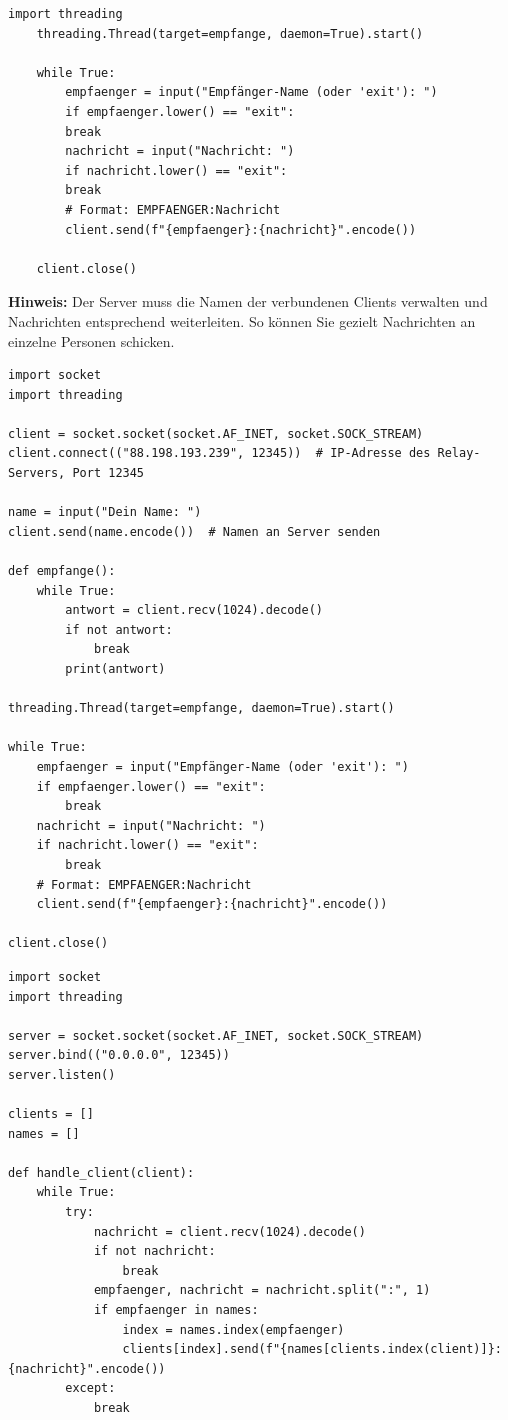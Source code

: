 \begin{myexercise}
\begin{lstlisting}[caption={client.py}]
    import threading
    threading.Thread(target=empfange, daemon=True).start()

    while True:
        empfaenger = input("Empfänger-Name (oder 'exit'): ")
        if empfaenger.lower() == "exit":
        break
        nachricht = input("Nachricht: ")
        if nachricht.lower() == "exit":
        break
        # Format: EMPFAENGER:Nachricht
        client.send(f"{empfaenger}:{nachricht}".encode())

    client.close()
\end{lstlisting}
    \textbf{Hinweis:} Der Server muss die Namen der verbundenen Clients verwalten und Nachrichten entsprechend weiterleiten. So können Sie gezielt Nachrichten an einzelne Personen schicken.
    \begin{myanswer}
        \begin{lstlisting}[caption=\texttt{client.py}]
import socket
import threading

client = socket.socket(socket.AF_INET, socket.SOCK_STREAM)
client.connect(("88.198.193.239", 12345))  # IP-Adresse des Relay-Servers, Port 12345

name = input("Dein Name: ")
client.send(name.encode())  # Namen an Server senden

def empfange():
    while True:
        antwort = client.recv(1024).decode()
        if not antwort:
            break
        print(antwort)

threading.Thread(target=empfange, daemon=True).start()

while True:
    empfaenger = input("Empfänger-Name (oder 'exit'): ")
    if empfaenger.lower() == "exit":
        break
    nachricht = input("Nachricht: ")
    if nachricht.lower() == "exit":
        break
    # Format: EMPFAENGER:Nachricht
    client.send(f"{empfaenger}:{nachricht}".encode())

client.close()
        \end{lstlisting}
    \end{myanswer}
    \begin{myanswer}
        \begin{lstlisting}[caption=\texttt{server.py}]
import socket
import threading

server = socket.socket(socket.AF_INET, socket.SOCK_STREAM)
server.bind(("0.0.0.0", 12345))
server.listen()

clients = []
names = []

def handle_client(client):
    while True:
        try:
            nachricht = client.recv(1024).decode()
            if not nachricht:
                break
            empfaenger, nachricht = nachricht.split(":", 1)
            if empfaenger in names:
                index = names.index(empfaenger)
                clients[index].send(f"{names[clients.index(client)]}: {nachricht}".encode())
        except:
            break


\end{lstlisting}
\end{myanswer}
\end{myexercise}
